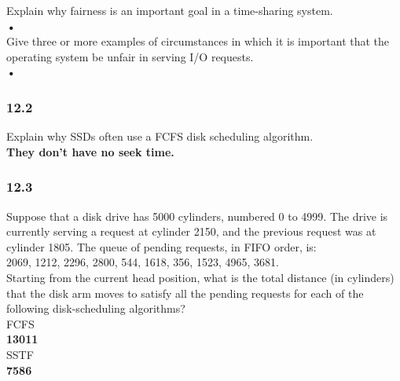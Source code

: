 \documentclass[a4paper,10pt,titlepage]{report}
\begin{document}
\hspace{10mm} 	Explain why fairness is an important goal in a time-sharing system.\\
\hspace{15mm} \textbf{•} \\


\hspace{10mm} 	Give three or more examples of circumstances in which it is important that the operating system be unfair in serving I/O requests.\\
\hspace{15mm} \textbf{•} \\




\subsubsection{12.2} Explain why SSDs often use a FCFS disk scheduling algorithm.\\
\hspace{15mm} \textbf{They don't have no seek time.} \\


\subsubsection{12.3} Suppose that a disk drive has 5000 cylinders, numbered 0 to 4999. The drive is currently serving a request at cylinder 2150, and the previous request was at cylinder 1805. The queue of pending requests, in FIFO order, is:\\

2069, 1212, 2296, 2800, 544, 1618, 356, 1523, 4965, 3681.  \\

Starting from the current head position, what is the total distance (in cylinders) that the disk arm moves to satisfy all the pending requests for each of the following disk-scheduling algorithms? \\


\hspace{10mm} 	FCFS     \\
\hspace{15mm} \textbf{13011} \\

\hspace{10mm} 	SSTF    \\
\hspace{15mm}\textbf{7586} \\
\end{document}
